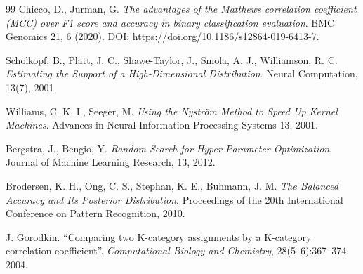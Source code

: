 \documentclass[12pt,oneside]{report}
\begin{document}
\begin{thebibliography}{99}
Chicco, D., Jurman, G.
\emph{The advantages of the Matthews correlation coefficient (MCC) over F1 score and accuracy in binary classification evaluation}.
BMC Genomics 21, 6 (2020). DOI: \url{https://doi.org/10.1186/s12864-019-6413-7}.


Schölkopf, B., Platt, J. C., Shawe-Taylor, J., Smola, A. J., Williamson, R. C.
\emph{Estimating the Support of a High-Dimensional Distribution}.
Neural Computation, 13(7), 2001.

Williams, C. K. I., Seeger, M.
\emph{Using the Nyström Method to Speed Up Kernel Machines}.
Advances in Neural Information Processing Systems 13, 2001.

Bergstra, J., Bengio, Y.
\emph{Random Search for Hyper-Parameter Optimization}.
Journal of Machine Learning Research, 13, 2012.

Brodersen, K. H., Ong, C. S., Stephan, K. E., Buhmann, J. M.
\emph{The Balanced Accuracy and Its Posterior Distribution}.
Proceedings of the 20th International Conference on Pattern Recognition, 2010.

J. Gorodkin. ``Comparing two K-category assignments by a K-category correlation coefficient''. \textit{Computational Biology and Chemistry}, 28(5--6):367--374, 2004.

\end{thebibliography}
\end{document}

